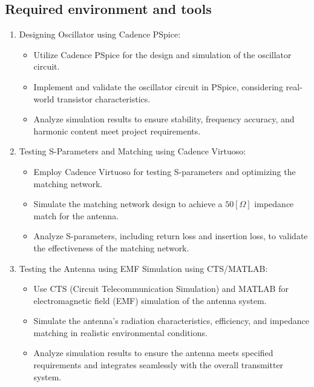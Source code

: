 \documentclass[]{extarticle}
\begin{document}
\subsection{Required environment and tools}
\begin{enumerate}
    \item Designing Oscillator using Cadence PSpice:
    \begin{itemize}
        \item Utilize Cadence PSpice for the design and simulation of the oscillator circuit.
        \item Implement and validate the oscillator circuit in PSpice, considering real-world transistor characteristics.
        \item Analyze simulation results to ensure stability, frequency accuracy, and harmonic content meet project requirements.
    \end{itemize}

    \item Testing S-Parameters and Matching using Cadence Virtuoso:
    \begin{itemize}
        \item Employ Cadence Virtuoso for testing S-parameters and optimizing the matching network.
        \item Simulate the matching network design to achieve a \(50[\Omega]\) impedance match for the antenna.
        \item Analyze S-parameters, including return loss and insertion loss, to validate the effectiveness of the matching network.
    \end{itemize}

    \item Testing the Antenna using EMF Simulation using CTS/MATLAB:
    \begin{itemize}
        \item Use CTS (Circuit Telecommunication Simulation) and MATLAB for electromagnetic field (EMF) simulation of the antenna system.
        \item Simulate the antenna's radiation characteristics, efficiency, and impedance matching in realistic environmental conditions.
        \item Analyze simulation results to ensure the antenna meets specified requirements and integrates seamlessly with the overall transmitter system.
    \end{itemize}
\end{enumerate}

\newpage
\end{document}
